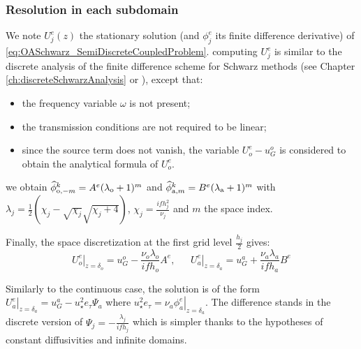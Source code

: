 \subsubsection{Resolution in each subdomain}
\label{sec:OASchwarz_SteadyStateInner}
We note $U_j^e(z)$ the stationary solution (and ${\phi}_j^e$ its finite difference derivative) of
\eqref{eq:OASchwarz_SemiDiscreteCoupledProblem}.
computing $U_j^e$ is similar
to the discrete analysis of the finite difference scheme for
Schwarz methods (see Chapter \ref{ch:discreteSchwarzAnalysis} or
\cite{wu_optimized_2017}),
except that:
\begin{itemize}
	\item the frequency variable $\omega$ is not present;
	\item the transmission conditions are not required to
		be linear;
	\item since the source term does not vanish,
		the variable $U^e_o - u_G^o$ is considered
		to obtain the analytical formula of $U^e_o$.
\end{itemize}
we obtain
$\widehat{\phi}_{{\rm o}, -m}^k = A^e
(\lambda_{\rm o}+1)^m$
and
$\widehat{\phi}_{{\rm a}, m}^k = B^e
(\lambda_{\rm a}+1)^m$ 
with $\lambda_j = \frac{1}{2}\left(\chi_j - \sqrt{\chi_j} \sqrt{\chi_j + 4}\right)$, 
$\chi_j=\frac{i f h_j^2}{\nu_j}$
and $m$ the space index.
\par
Finally, the space discretization at the first grid level
$\frac{h_j}{2}$ gives:
\begin{equation}
		\left.{U}^e_o\right|_{z=\delta_o} =
u_G^o - \frac{\nu_o\lambda_o}{if h_o} A^e, ~~~~~~~
		\left.{U}^e_a\right|_{z=\delta_a} =
u_G^a + \frac{\nu_a\lambda_a}{if h_a} B^e
\end{equation}
\begin{remark}
Similarly to the continuous case, the solution is of the form
	$\left.{U}^e_a\right|_{z=\delta_a} = u_G^a -
	u_\star^2 e_{\tau}\Psi_a$
	where $u_\star^2 e_{\tau} =
	\left.\nu_a \phi_a^e\right|_{z=\delta_a}$.
The difference stands in the discrete version of
$\Psi_j = -\frac{\lambda_j}{if h_j}$
which is simpler thanks to the hypotheses of constant diffusivities
and infinite domains.
\end{remark}
